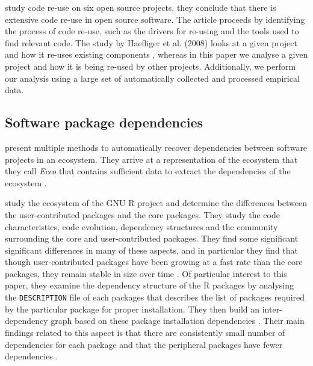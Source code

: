 \documentclass[smallextended,final]{svjour3}
\begin{document}
\citet{haefliger08} study code re-use on six open source projects, they conclude that there is extensive code re-use in open source software. The article proceeds by identifying the process of code re-use, such as the drivers for re-using and the tools used to find relevant code. The study by Haefliger et al. (2008) looks at a given project and how it  re-uses existing components \citep{haefliger08}, whereas in this paper we analyse a given project and how it is being re-used by other projects. Additionally, we perform our analysis using a large set of automatically collected and processed empirical data.

\subsection{Software package dependencies}

\citet{lungu10} present multiple methods to automatically recover dependencies between software projects in an ecosystem. They arrive at a representation of the ecosystem that they call \textit{Ecco} that contains sufficient data to extract the dependencies of the ecosystem \citep{lungu10}.

\citet{german13} study the ecosystem of the GNU R project and determine the differences between the user-contributed packages and the core packages. They study the code characteristics, code evolution, dependency structures and the community surrounding the core and user-contributed packages. They find some significant significant differences in many of these aspects, and in particular they find that though user-contributed packages have been growing at a fast rate than the core packages, they remain stable in size over time \citep{german13}. Of particular interest to this paper, they examine the dependency structure of the R packages by analysing the \texttt{DESCRIPTION} file of each packages that describes the list of packages required by the particular package for proper installation. They then build an inter-dependency graph based on these package installation dependencies \citep{german13}. Their main findings related to this aspect is that there are consistently small number of dependencies for each package and that the peripheral packages have fewer dependencies \citep{german13}.
\end{document}
